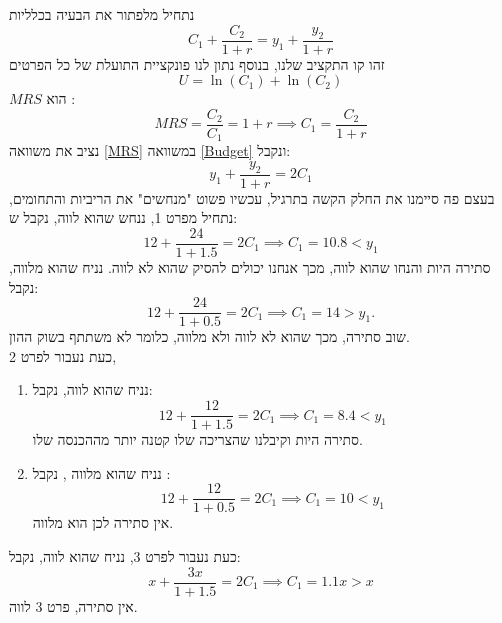 \documentclass[12pt]{article}
\renewcommand{\qed}{\hfill\blacksquare}
\begin{document}
נתחיל מלפתור את הבעיה בכלליות
\begin{equation}
    C_1 + \frac{C_2}{1+r} = y_1 + \frac{y_2}{1+r}
    \label{Budget}
\end{equation}
זהו קו התקציב שלנו, בנוסף נתון לנו פונקציית התועלת של כל הפרטים
\begin{equation}
    U = \ln(C_1) + \ln(C_2)
    \label{Utility}
\end{equation}
$MRS$ הוא :
\begin{equation}
    MRS = \frac{C_2}{C_1} = 1+r \implies C_1 = \frac{C_2}{1+r}
    \label{MRS}
\end{equation}
נציב את משוואה \ref{MRS} במשוואה \ref{Budget} ונקבל:
\begin{equation}
    y_1 + \frac{y_2}{1+r} = 2C_1
\end{equation}
בעצם פה סיימנו את החלק הקשה בתרגיל, עכשיו פשוט "מנחשים" את הריביות והתחומים, נתחיל מפרט 1, ננחש שהוא לווה, נקבל ש:
\begin{equation}
    12 + \frac{24}{1+1.5} = 2C_1 \implies C_1 = 10.8 < y_1
\end{equation}
סתירה היות והנחו שהוא לווה, מכך אנחנו יכולים להסיק שהוא לא לווה.
נניח שהוא מלווה, נקבל:
\begin{equation}
    12 + \frac{24}{1+0.5} = 2C_1 \implies C_1 = 14 > y_1.
\end{equation}
שוב סתירה, מכך שהוא לא לווה ולא מלווה, כלומר לא משתתף בשוק ההון. \qed
\\ 
כעת נעבור לפרט 2, 
\begin{enumerate}
    \item נניח שהוא לווה, נקבל: \begin{equation}
        12 + \frac{12}{1+1.5} = 2C_1 \implies C_1 = 8.4 < y_1
    \end{equation}
    סתירה היות וקיבלנו שהצריכה שלו קטנה יותר מההכנסה שלו.
    \item נניח שהוא מלווה , נקבל : \begin{equation}
        12 + \frac{12}{1+0.5} = 2C_1 \implies C_1 = 10 < y_1
    \end{equation}
    אין סתירה לכן הוא מלווה. \qed
    
\end{enumerate}

כעת נעבור לפרט 3, נניח שהוא לווה, נקבל:
\begin{equation}
    x + \frac{3x}{1+1.5} = 2C_1 \implies C_1 = 1.1x > x
\end{equation}
אין סתירה, פרט 3 לווה. \qed
\newpage
\end{document}
